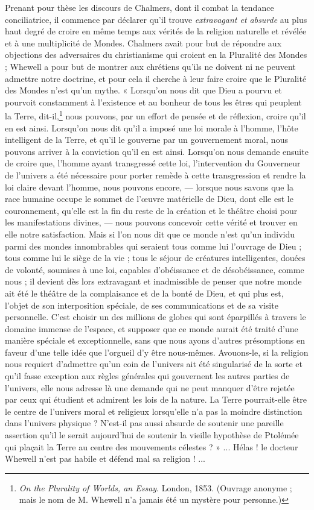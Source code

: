 \documentclass[a4paper, 11pt, oneside, landscape]{article}
\begin{document}
Prenant pour thèse les discours de Chalmers, dont il combat la tendance conciliatrice, il commence par déclarer qu'il trouve \emph{extravagant et absurde} au plus haut degré de croire en même temps aux vérités de la religion naturelle et révélée et à une multiplicité de Mondes. Chalmers avait pour but de répondre aux objections des adversaires du christianisme qui croient en la Pluralité des Mondes ; Whewell a pour but de montrer aux chrétiens qu'ils ne doivent ni ne peuvent admettre notre doctrine, et pour cela il cherche à leur faire croire que le Pluralité des Mondes n'est qu'un mythe. « Lorsqu'on nous dit que Dieu a pourvu et pourvoit constamment à l'existence et au bonheur de tous les êtres qui peuplent la Terre, dit-il,\footnote{\emph{On the Plurality of Worlds, an Essay}. London, 1853. (Ouvrage anonyme ; mais le nom de M. Whewell n'a jamais été un mystère pour personne.)} nous pouvons, par un effort de pensée et de réflexion, croire qu'il en est ainsi. Lorsqu'on nous dit qu'il a imposé une loi morale à l'homme, l'hôte intelligent de la Terre, et qu'il le gouverne par un gouvernement moral, nous pouvons arriver à la conviction qu'il en est ainsi. Lorsqu'on nous demande ensuite de croire que, l'homme ayant transgressé cette loi, l'intervention du Gouverneur de l'univers a été nécessaire pour porter remède à cette transgression et rendre la loi claire devant l'homme, nous pouvons encore, --- lorsque nous savons que la race humaine occupe le sommet de l'œuvre matérielle de Dieu, dont elle est le couronnement, qu'elle est la fin du reste de la création et le théâtre choisi pour les manifestations divines, --- nous pouvons concevoir cette vérité et trouver en elle notre satisfaction. Mais si l'on nous dit que ce monde n'est qu'un individu parmi des mondes innombrables qui seraient tous comme lui l'ouvrage de Dieu ; tous comme lui le siège de la vie ; tous le séjour de créatures intelligentes, douées de volonté, soumises à une loi, capables d'obéissance et de désobéissance, comme nous ; il devient dès lors extravagant et inadmissible de penser que notre monde ait été le théâtre de la complaisance et de la bonté de Dieu, et qui plus est, l'objet de son interposition spéciale, de ses communications et de sa visite personnelle. C'est choisir un des millions de globes qui sont éparpillés à travers le domaine immense de l'espace, et supposer que ce monde aurait été traité d'une manière spéciale et exceptionnelle, sans que nous ayons d'autres présomptions en faveur d'une telle idée que l'orgueil d'y être nous-mêmes. Avouons-le, si la religion nous requiert d'admettre qu'un coin de l'univers ait été singularisé de la sorte et qu'il fasse exception aux règles générales qui gouvernent les autres parties de l'univers, elle nous adresse là une demande qui ne peut manquer d'être rejetée par ceux qui étudient et admirent les lois de la nature. La Terre pourrait-elle être le centre de l'univers moral et religieux lorsqu'elle n'a pas la moindre distinction dans l'univers physique ? N'est-il pas aussi absurde de soutenir une pareille assertion qu'il le serait aujourd'hui de soutenir la vieille hypothèse de Ptolémée qui plaçait la Terre au centre des mouvements célestes ? » ... Hélas ! le docteur Whewell n'est pas habile et défend mal sa religion ! ...
\end{document}
